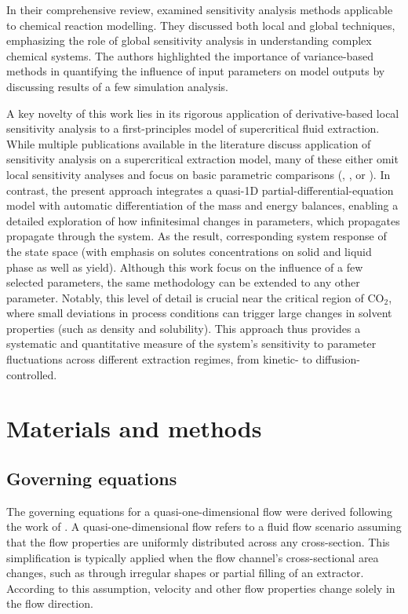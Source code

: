 \documentclass[a4paper,fleqn]{cas-dc}
\begin{document}
	In their comprehensive review, \citet{Saltelli2005} examined sensitivity analysis methods applicable to chemical reaction modelling. They discussed both local and global techniques, emphasizing the role of global sensitivity analysis in understanding complex chemical systems. The authors highlighted the importance of variance-based methods in quantifying the influence of input parameters on model outputs by discussing results of a few simulation analysis.
	
	A key novelty of this work lies in its rigorous application of derivative-based local sensitivity analysis to a first-principles model of supercritical fluid extraction. While multiple publications available in the literature discuss application of sensitivity analysis on a supercritical extraction model, many of these either omit local sensitivity analyses and focus on basic parametric comparisons (\citet{Santos2000}, \citet{Fiori_2007}, or \citet{Zahedi2010}). In contrast, the present approach integrates a quasi-1D partial-differential-equation model with automatic differentiation of the mass and energy balances, enabling a detailed exploration of how infinitesimal changes in parameters, which propagates propagate through the system. As the result, corresponding system response of the state space (with emphasis on solutes concentrations on solid and liquid phase as well as yield). Although this work focus on the influence of a few selected parameters, the same methodology can be extended to any other parameter. Notably, this level of detail is crucial near the critical region of CO$_2$, where small deviations in process conditions can trigger large changes in solvent properties (such as density and solubility). This approach thus provides a systematic and quantitative measure of the system’s sensitivity to parameter fluctuations across different extraction regimes, from kinetic- to diffusion-controlled.
	
	
	\section{Materials and methods} \label{CH: Materials and methods}
	
	\subsection{Governing equations} \label{CH:Governing_equations_chapter}
	The governing equations for a quasi-one-dimensional flow were derived following the work of \citet{Anderson1995}. A quasi-one-dimensional flow refers to a fluid flow scenario assuming that the flow properties are uniformly distributed across any cross-section. This simplification is typically applied when the flow channel's cross-sectional area changes, such as through irregular shapes or partial filling of an extractor. According to this assumption, velocity and other flow properties change solely in the flow direction.
	
\end{document}
